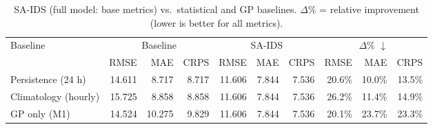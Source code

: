 \begin{table}[ht]
\centering
\caption{SA-IDS (full model: base metrics) vs.\ statistical and GP baselines.
         $\Delta$\% = relative improvement (lower is better for all metrics).}
\label{tab:baseline_comparison}
\begin{tabular}{lrrr|rrr|rrr}
\toprule
Baseline & \multicolumn{3}{c|}{Baseline} & \multicolumn{3}{c|}{SA-IDS} & \multicolumn{3}{c}{$\Delta$\% $\downarrow$} \\
 & RMSE & MAE & CRPS & RMSE & MAE & CRPS & RMSE & MAE & CRPS \\
\midrule
Persistence (24 h) & 14.611 & 8.717 & 8.717 & 11.606 & 7.844 & 7.536 & 20.6\% & 10.0\% & 13.5\% \\
Climatology (hourly) & 15.725 & 8.858 & 8.858 & 11.606 & 7.844 & 7.536 & 26.2\% & 11.4\% & 14.9\% \\
GP only (M1) & 14.524 & 10.275 & 9.829 & 11.606 & 7.844 & 7.536 & 20.1\% & 23.7\% & 23.3\% \\
\bottomrule
\end{tabular}
\end{table}
